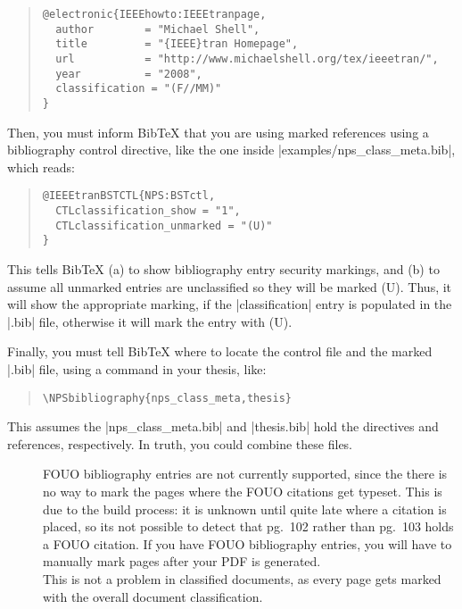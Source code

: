 \begin{quotation}
\begin{Verbatim}
@electronic{IEEEhowto:IEEEtranpage,
  author        = "Michael Shell",
  title         = "{IEEE}tran Homepage",
  url           = "http://www.michaelshell.org/tex/ieeetran/",
  year          = "2008",
  classification = "(F//MM)"
}
\end{Verbatim}
\end{quotation}

Then, you must inform Bib\TeX{} that you are using marked references using
a bibliography control directive, like the one inside |examples/nps_class_meta.bib|,
which reads:
\begin{quotation}
\begin{Verbatim}
@IEEEtranBSTCTL{NPS:BSTctl,
  CTLclassification_show = "1",
  CTLclassification_unmarked = "(U)"
}
\end{Verbatim}
\end{quotation}

This tells Bib\TeX{} (a) to show bibliography entry security markings, and
(b) to assume all unmarked entries are unclassified so they will
be marked (U). Thus, it will show the appropriate marking, if the
|classification| entry is populated in the |.bib| file, otherwise it will
mark the entry with (U).

Finally, you must tell Bib\TeX{} where to locate the control file and
the marked |.bib| file, using a command in your thesis, like:
\begin{quotation}
\begin{Verbatim}
\NPSbibliography{nps_class_meta,thesis}
\end{Verbatim}
\end{quotation}

This assumes the |nps_class_meta.bib| and |thesis.bib|
hold the directives and references, respectively. 
In truth, you could combine these files.

\begin{description}
\item[]
FOUO bibliography entries are not currently supported, since the
there is no way to mark the pages where the FOUO citations
get typeset. This is due to the build process: it is unknown
until quite late where a citation is placed, so its not possible
to detect that pg.\ 102 rather than pg.\ 103 holds a FOUO citation.
If you have FOUO bibliography entries, you will have to manually
mark pages after your PDF is generated.\\
This is not a problem in classified documents, as every page gets
marked with the overall document classification. 
\end{description}

